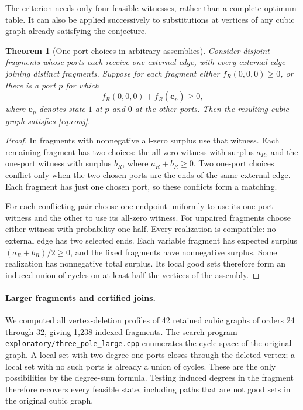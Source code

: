 \documentclass[11pt]{article}
\newtheorem{theorem}{Theorem}[section]
\begin{document}
The criterion needs only four feasible witnesses, rather than a
complete optimum table. It can also be applied successively to
substitutions at vertices of any cubic graph already satisfying the
conjecture.

\begin{theorem}[One-port choices in arbitrary assemblies]
\label{thm:one-port-assembly}
Consider disjoint fragments whose ports each receive one external
edge, with every external edge joining distinct fragments. Suppose
for each fragment either $f_R(0,0,0)\geq0$, or there is a port $p$
for which
\[
 f_R(0,0,0)+f_R(\mathbf e_p)\geq0,
\]
where $\mathbf e_p$ denotes state $1$ at $p$ and $0$ at the other
ports. Then the resulting cubic graph satisfies \eqref{eq:conj}.
\end{theorem}
\begin{proof}
In fragments with nonnegative all-zero surplus use that witness.
Each remaining fragment has two choices: the all-zero witness with
surplus $a_R$, and the one-port witness with surplus $b_R$, where
$a_R+b_R\geq0$. Two one-port choices conflict only when the two
chosen ports are the ends of the same external edge. Each fragment
has just one chosen port, so these conflicts form a matching.

For each conflicting pair choose one endpoint uniformly to use its
one-port witness and the other to use its all-zero witness. For
unpaired fragments choose either witness with probability one half.
Every realization is compatible: no external edge has two selected
ends. Each variable fragment has expected surplus
$(a_R+b_R)/2\geq0$, and the fixed fragments have nonnegative surplus.
Some realization has nonnegative total surplus. Its local good sets
therefore form an induced union of cycles on at least half the
vertices of the assembly.
\end{proof}

\paragraph{Larger fragments and certified joins.}
We computed all vertex-deletion profiles of 42 retained cubic graphs
of orders 24 through 32, giving 1,238 indexed fragments. The search
program \texttt{exploratory/three\_pole\_large.cpp} enumerates the
cycle space of the original graph. A local set with two degree-one
ports closes through the deleted vertex; a local set with no such
ports is already a union of cycles. These are the only possibilities
by the degree-sum formula. Testing induced degrees in the fragment
therefore recovers every feasible state, including paths that are
not good sets in the original cubic graph.
\end{document}
